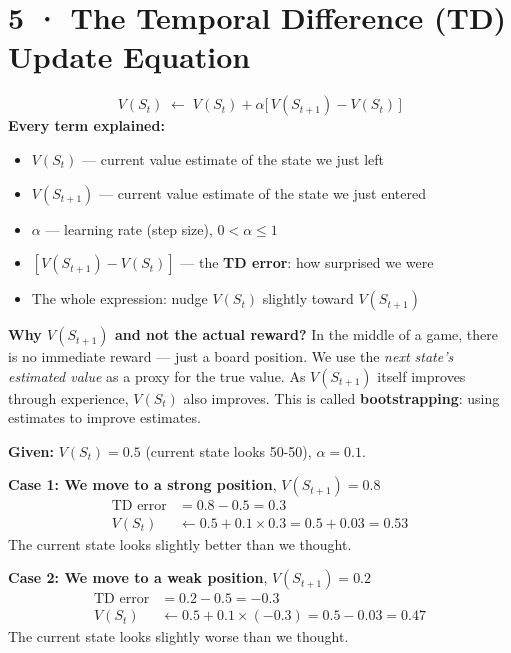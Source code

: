 \documentclass[11pt,a4paper]{article}
\begin{document}
\section*{5 · The Temporal Difference (TD) Update Equation}

\begin{tcolorbox}[bold={TD Update — The Central Equation of Session 1}]
\[
  V(S_t) \;\leftarrow\; V(S_t) + \alpha \bigl[\, V(S_{t+1}) - V(S_t) \,\bigr]
\]
\textbf{Every term explained:}
\begin{itemize}
  \item $V(S_t)$ — current value estimate of the state we just left
  \item $V(S_{t+1})$ — current value estimate of the state we just entered
  \item $\alpha$ — learning rate (step size), $0 < \alpha \leq 1$
  \item $[V(S_{t+1}) - V(S_t)]$ — the \textbf{TD error}: how surprised we were
  \item The whole expression: nudge $V(S_t)$ slightly toward $V(S_{t+1})$
\end{itemize}
\end{tcolorbox}

\textbf{Why $V(S_{t+1})$ and not the actual reward?}
In the middle of a game, there is no immediate reward — just a board position.
We use the \emph{next state's estimated value} as a proxy for the true value.
As $V(S_{t+1})$ itself improves through experience, $V(S_t)$ also improves.
This is called \textbf{bootstrapping}: using estimates to improve estimates.

\begin{tcolorbox}[exam={Worked Example — TD Update}]
\textbf{Given:} $V(S_t) = 0.5$ (current state looks 50-50),
$\alpha = 0.1$.

\medskip
\textbf{Case 1: We move to a strong position}, $V(S_{t+1}) = 0.8$
\begin{align*}
  \text{TD error} &= 0.8 - 0.5 = 0.3 \\
  V(S_t) &\leftarrow 0.5 + 0.1 \times 0.3 = 0.5 + 0.03 = \mathbf{0.53}
\end{align*}
The current state looks slightly better than we thought.

\medskip
\textbf{Case 2: We move to a weak position}, $V(S_{t+1}) = 0.2$
\begin{align*}
  \text{TD error} &= 0.2 - 0.5 = -0.3 \\
  V(S_t) &\leftarrow 0.5 + 0.1 \times (-0.3) = 0.5 - 0.03 = \mathbf{0.47}
\end{align*}
The current state looks slightly worse than we thought.
\end{tcolorbox}
\end{document}

